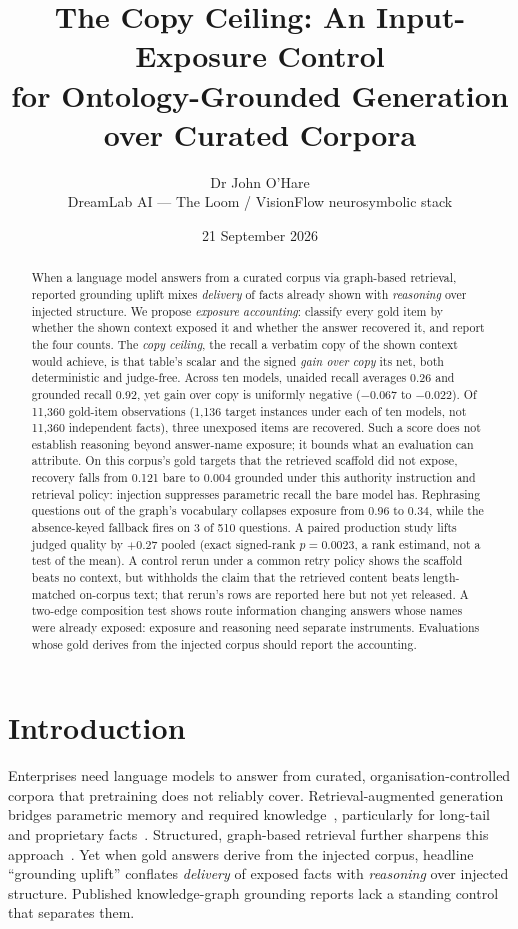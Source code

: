 \documentclass[10pt,twocolumn]{article}
\title{\vspace{-1.2cm}\bfseries The Copy Ceiling: An Input-Exposure Control\\
for Ontology-Grounded Generation over Curated Corpora}
\author{Dr John O'Hare\\ \small DreamLab AI --- The Loom / VisionFlow neurosymbolic stack}
\date{21 September 2026}
\begin{document}
\maketitle

\begin{abstract}
\noindent
When a language model answers from a curated corpus via graph-based retrieval, reported grounding uplift mixes \emph{delivery} of facts already shown with \emph{reasoning} over injected structure. We propose \emph{exposure accounting}: classify every gold item by whether the shown context exposed it and whether the answer recovered it, and report the four counts. The \emph{copy ceiling}, the recall a verbatim copy of the shown context would achieve, is that table's scalar and the signed \emph{gain over copy} its net, both deterministic and judge-free. Across ten models, unaided recall averages 0.26 and grounded recall 0.92, yet gain over copy is uniformly negative ($-0.067$ to $-0.022$). Of 11{,}360 gold-item observations (1{,}136 target instances under each of ten models, not 11{,}360 independent facts), three unexposed items are recovered. Such a score does not establish reasoning beyond answer-name exposure; it bounds what an evaluation can attribute. On this corpus's gold targets that the retrieved scaffold did not expose, recovery falls from 0.121 bare to 0.004 grounded under this authority instruction and retrieval policy: injection suppresses parametric recall the bare model has. Rephrasing questions out of the graph's vocabulary collapses exposure from 0.96 to 0.34, while the absence-keyed fallback fires on 3 of 510 questions. A paired production study lifts judged quality by $+0.27$ pooled (exact signed-rank $p=0.0023$, a rank estimand, not a test of the mean). A control rerun under a common retry policy shows the scaffold beats no context, but withholds the claim that the retrieved content beats length-matched on-corpus text; that rerun's rows are reported here but not yet released. A two-edge composition test shows route information changing answers whose names were already exposed: exposure and reasoning need separate instruments. Evaluations whose gold derives from the injected corpus should report the accounting.
\end{abstract}

\section{Introduction}\label{sec:intro}
Enterprises need language models to answer from curated, organisation-controlled corpora that pretraining does not reliably cover. Retrieval-augmented generation bridges parametric memory and required knowledge~\cite{lewis2020rag,gao2023ragsurvey}, particularly for long-tail and proprietary facts~\cite{mallen2023trust}. Structured, graph-based retrieval further sharpens this approach~\cite{edge2024graphrag,guo2024lightrag,baek2023kaping,pan2024unifying}. Yet when gold answers derive from the injected corpus, headline ``grounding uplift'' conflates \emph{delivery} of exposed facts with \emph{reasoning} over injected structure. Published knowledge-graph grounding reports lack a standing control that separates them.
\end{document}
